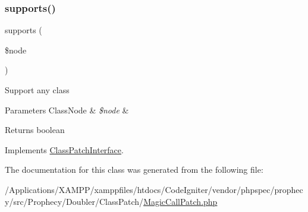 \mbox{\label{class_prophecy_1_1_doubler_1_1_class_patch_1_1_magic_call_patch_a99b2455ac194faf79aff042c55719ac2}} 
\subsubsection{\texorpdfstring{supports()}{supports()}}
{\footnotesize\ttfamily supports (\begin{DoxyParamCaption}\item[{\mbox{\hyperlink{class_prophecy_1_1_doubler_1_1_generator_1_1_node_1_1_class_node}{Class\+Node}}}]{\$node }\end{DoxyParamCaption})}

Support any class


\begin{DoxyParams}[1]{Parameters}
Class\+Node & {\em \$node} & \\
\hline
\end{DoxyParams}
\begin{DoxyReturn}{Returns}
boolean 
\end{DoxyReturn}


Implements \mbox{\hyperlink{interface_prophecy_1_1_doubler_1_1_class_patch_1_1_class_patch_interface_a99b2455ac194faf79aff042c55719ac2}{Class\+Patch\+Interface}}.



The documentation for this class was generated from the following file\+:\begin{DoxyCompactItemize}
\item 
/\+Applications/\+X\+A\+M\+P\+P/xamppfiles/htdocs/\+Code\+Igniter/vendor/phpspec/prophecy/src/\+Prophecy/\+Doubler/\+Class\+Patch/\mbox{\hyperlink{_magic_call_patch_8php}{Magic\+Call\+Patch.\+php}}\end{DoxyCompactItemize}
